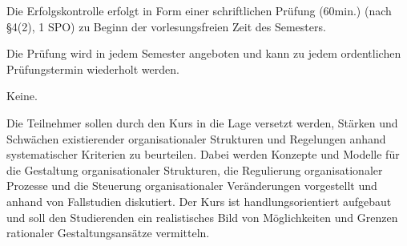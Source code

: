 \begin{course}

\setdoclanguagegerman
{}



\coursehead


\label{cour_5017.dp_997}


\begin{styleenv}
\begin{assessment}
Die Erfolgskontrolle erfolgt in Form einer schriftlichen Prüfung (60min.) (nach §4(2), 1 SPO) zu Beginn der vorlesungsfreien Zeit des Semesters.

 

Die Prüfung wird in jedem Semester angeboten und kann zu jedem ordentlichen Prüfungstermin wiederholt werden.


\end{assessment}

\begin{conditions}Keine.\end{conditions}


\end{styleenv}

\begin{learningoutcomes}
Die Teilnehmer sollen durch den Kurs in die Lage versetzt werden, Stärken und Schwächen existierender organisationaler Strukturen und Regelungen anhand systematischer Kriterien zu beurteilen. Dabei werden Konzepte und Modelle für die Gestaltung organisationaler Strukturen, die Regulierung organisationaler Prozesse und die Steuerung organisationaler Veränderungen vorgestellt und anhand von Fallstudien diskutiert. Der Kurs ist handlungsorientiert aufgebaut und soll den Studierenden ein realistisches Bild von Möglichkeiten und Grenzen rationaler Gestaltungsansätze vermitteln.


\end{learningoutcomes}


\end{course}
